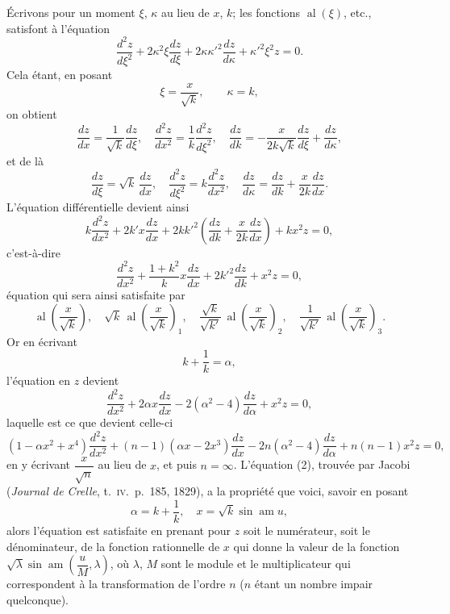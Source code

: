 \documentclass[11pt,a4paper]{article}
\providecommand{\al}{\mathop{\mathrm{al}}\nolimits}
\providecommand{\am}{\mathop{\mathrm{am}}\nolimits}
\begin{document}
\'{E}crivons pour un moment $\xi$, $\kappa$ au lieu de $x$, $k$; les fonctions $\al(\xi)$, etc., satisfont \`{a} l'\'{e}quation
\[
\frac{d^2 z}{d\xi^2}+2\kappa^2\xi\frac{dz}{d\xi}+2\kappa\kappa'^2\frac{dz}{d\kappa}+\kappa'^2\xi^2 z=0.
\]
Cela \'{e}tant, en posant
\[
\xi=\frac{x}{\sqrt{k}},\qquad \kappa=k,
\]
on obtient
\[
\frac{dz}{dx}=\frac{1}{\sqrt{k}}\frac{dz}{d\xi},\quad \frac{d^2z}{dx^2}=\frac{1}{k}\frac{d^2z}{d\xi^2},\quad \frac{dz}{dk}=-\frac{x}{2k\sqrt{k}}\frac{dz}{d\xi}+\frac{dz}{d\kappa},
\]
et de l\`{a}
\[
\frac{dz}{d\xi}=\sqrt{k}\,\frac{dz}{dx},\quad \frac{d^2z}{d\xi^2}=k\frac{d^2z}{dx^2},\quad \frac{dz}{d\kappa}=\frac{dz}{dk}+\frac{x}{2k}\frac{dz}{dx}.
\]
L'\'{e}quation diff\'{e}rentielle devient ainsi
\[
k\frac{d^2z}{dx^2}+2k'x\frac{dz}{dx}+2kk'^2\!\left(\frac{dz}{dk}+\frac{x}{2k}\frac{dz}{dx}\right)+kx^2 z=0,
\]
c'est-\`{a}-dire
\[
\frac{d^2z}{dx^2}+\frac{1+k^2}{k}x\frac{dz}{dx}+2k'^2\frac{dz}{dk}+x^2 z=0,
\]
\'{e}quation qui sera ainsi satisfaite par
\[
\al\!\left(\frac{x}{\sqrt{k}}\right),\quad \sqrt{k}\,\al\!\left(\frac{x}{\sqrt{k}}\right)_1,\quad \frac{\sqrt{k}}{\sqrt{k'}}\,\al\!\left(\frac{x}{\sqrt{k}}\right)_2,\quad \frac{1}{\sqrt{k'}}\,\al\!\left(\frac{x}{\sqrt{k}}\right)_3.
\]
Or en \'{e}crivant
\[
k+\frac{1}{k}=\alpha,
\]
l'\'{e}quation en $z$ devient
\begin{equation}
\frac{d^2z}{dx^2}+2\alpha x\frac{dz}{dx}-2(\alpha^2-4)\frac{dz}{d\alpha}+x^2 z=0,
\end{equation}
laquelle est ce que devient celle-ci
\begin{equation}
(1-\alpha x^2+x^4)\frac{d^2z}{dx^2}+(n-1)(\alpha x-2x^3)\frac{dz}{dx}-2n(\alpha^2-4)\frac{dz}{d\alpha}+n(n-1)x^2 z=0,
\end{equation}
en y \'{e}crivant $\dfrac{x}{\sqrt{n}}$ au lieu de $x$, et puis $n=\infty$. L'\'{e}quation (2), trouv\'{e}e par Jacobi (\textit{Journal de Crelle}, t.\ \textsc{iv}.\ p.\ 185, 1829), a la propri\'{e}t\'{e} que voici, savoir en posant
\[
\alpha=k+\frac{1}{k},\quad x=\sqrt{k}\sin\am u,
\]
alors l'\'{e}quation est satisfaite en prenant pour $z$ soit le num\'{e}rateur, soit le d\'{e}nominateur, de la fonction rationnelle de $x$ qui donne la valeur de la fonction $\sqrt{\lambda}\sin\am\!\left(\dfrac{u}{M},\lambda\right)$, o\`{u} $\lambda$, $M$ sont le module et le multiplicateur qui correspondent \`{a} la transformation de l'ordre $n$ ($n$ \'{e}tant un nombre impair quelconque).
\end{document}
